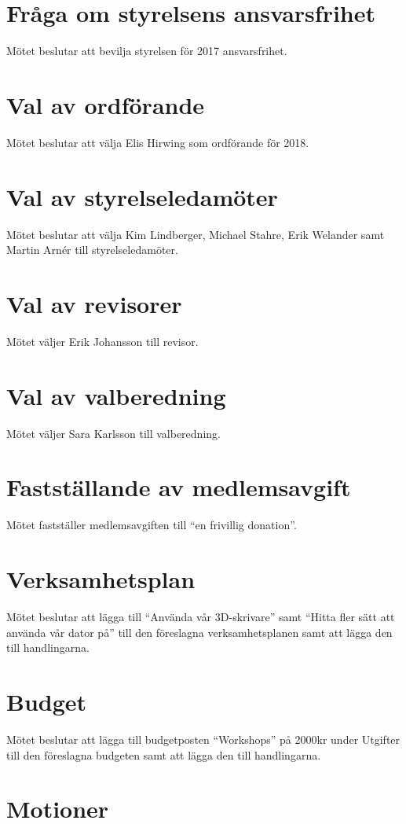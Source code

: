 \documentclass[a4paper,11pt,oneside]{article}
\begin{document}
\section{Fråga om styrelsens ansvarsfrihet}
Mötet beslutar att bevilja styrelsen för 2017 ansvarsfrihet.

\section{Val av ordförande}
Mötet beslutar att välja Elis Hirwing som ordförande för 2018.

\section{Val av styrelseledamöter}
Mötet beslutar att välja Kim Lindberger, Michael Stahre, Erik Welander samt Martin Arnér
till styrelseledamöter.

\section{Val av revisorer}
Mötet väljer Erik Johansson till revisor.

\section{Val av valberedning}
Mötet väljer Sara Karlsson till valberedning.

\section{Fastställande av medlemsavgift}
Mötet fastställer medlemsavgiften till ``en frivillig donation''.

\section{Verksamhetsplan}
Mötet beslutar att lägga till ``Använda vår 3D-skrivare'' samt ``Hitta fler sätt att
använda vår dator på'' till den föreslagna verksamhetsplanen samt att lägga den till
handlingarna.

\section{Budget}
Mötet beslutar att lägga till budgetposten ``Workshops'' på 2000kr under Utgifter
till den föreslagna budgeten samt att lägga den till handlingarna.

\section{Motioner}
\end{document}
